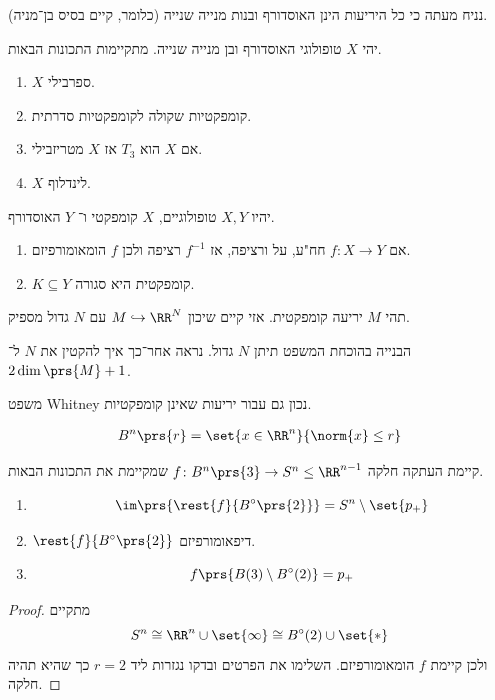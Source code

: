 \documentclass[a4paper,10pt,twoside,openany]{book}
\begin{document}
נניח מעתה כי כל היריעות הינן האוסדורף ובנות מנייה שנייה (כלומר, קיים בסיס בן־מניה).

\begin{exercise}
יהי
$X$
טופולוגי האוסדורף ובן מנייה שנייה.
מתקיימות התכונות הבאות.

\begin{enumerate}
\item
$X$
ספרבילי.
\item
קומפקטיות שקולה לקומפקטיות סדרתית.
\item אם
$X$
הוא
$T_3$
אז
$X$
מטריזבילי.
\item
$X$
לינדלוף.
\end{enumerate}
\end{exercise}
\begin{exercise}
יהיו
$X,Y$
טופולוגיים,
$X$
קומפקטי ו־%
$Y$
האוסדורף.
\begin{enumerate}
\item אם
$f \colon X \to Y$
חח"ע, על ורציפה, אז
$f^{-1}$
רציפה ולכן
$f$
הומאומורפיזם.
\item
$K \subseteq Y$
קומפקטית היא
סגורה.
\end{enumerate}
\end{exercise}
\begin{theorem}
תהי
$M$
יריעה קומפקטית. אזי קיים שיכון
$M \hookrightarrow \RR^N$
עם
$N$
גדול מספיק.
\end{theorem}
\begin{remark}
הבנייה בהוכחת המשפט תיתן
$N$
גדול. נראה אחר־כך איך להקטין את
$N$
ל־%
$2\dim\prs{M} + 1$.
\end{remark}
\begin{remark}
משפט
\textenglish{Whitney}
נכון גם עבור יריעות שאינן קומפקטיות.
\end{remark}
\begin{notation}
\begin{align*}
B^n\prs{r} = \set{x \in \RR^n}{\norm{x} \leq r}
\end{align*}
\end{notation}
\begin{lemma}
קיימת העתקה חלקה
$f \colon B^n\prs{3} \to S^n \leq \RR^{n-1}$
שמקיימת את התכונות הבאות.
\begin{enumerate}
\item \[\im\prs{\rest{f}{B^{\circ}\prs{2}}} = S^n \setminus \set{p_+}\]

\item $\rest{f}{B^{\circ}\prs{2}}$
דיפאומורפיזם.

\item \[f\prs{B(3) \setminus B^{\circ}(2)} = p_+\]

\end{enumerate}
\end{lemma}
\begin{proof}
מתקיים
\[S^n \cong \RR^n \cup \set{\infty} \cong B^{\circ}(2) \cup \set{*}\]
ולכן קיימת
$f$
הומאומורפיזם.
השלימו את הפרטים ובדקו נגזרות ליד
$r=2$
כך שהיא תהיה חלקה.
\end{proof}
\end{document}
